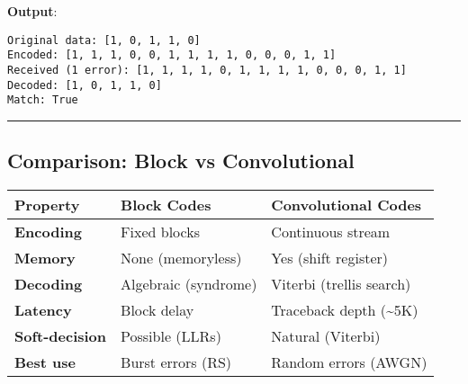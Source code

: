\begin{Shaded}
\begin{Highlighting}[]
\OperatorTok{=}
\NormalTok{(}\SpecialCharTok{\{}\SpecialCharTok{\}}\NormalTok{)}

\OperatorTok{=}
\NormalTok{received[}\NormalTok{] }\OperatorTok{\^{}=}   
\NormalTok{(}\SpecialCharTok{\{}\SpecialCharTok{\}}\NormalTok{)}

\OperatorTok{=}
\NormalTok{(}\SpecialCharTok{\{}\SpecialCharTok{\}}\NormalTok{)}
\NormalTok{(}\SpecialCharTok{\{}\OperatorTok{==}\SpecialCharTok{\}}\NormalTok{)}
\end{Highlighting}
\end{Shaded}

\textbf{Output}:

\begin{verbatim}
Original data: [1, 0, 1, 1, 0]
Encoded: [1, 1, 1, 0, 0, 1, 1, 1, 1, 0, 0, 0, 1, 1]
Received (1 error): [1, 1, 1, 1, 0, 1, 1, 1, 1, 0, 0, 0, 1, 1]
Decoded: [1, 0, 1, 1, 0]
Match: True
\end{verbatim}

\begin{center}\rule{0.5\linewidth}{0.5pt}\end{center}

\subsection{Comparison: Block vs
Convolutional}\label{comparison-block-vs-convolutional}

{\def\LTcaptype{} %
\begin{longtable}[]{@{}lll@{}}
\toprule\noalign{}
Property & Block Codes & Convolutional Codes \\
\midrule\noalign{}
\endhead
\bottomrule\noalign{}
\endlastfoot
\textbf{Encoding} & Fixed blocks & Continuous stream \\
\textbf{Memory} & None (memoryless) & Yes (shift register) \\
\textbf{Decoding} & Algebraic (syndrome) & Viterbi (trellis search) \\
\textbf{Latency} & Block delay & Traceback depth (\textasciitilde5K) \\
\textbf{Soft-decision} & Possible (LLRs) & Natural (Viterbi) \\
\textbf{Best use} & Burst errors (RS) & Random errors (AWGN) \\
\end{longtable}
}

